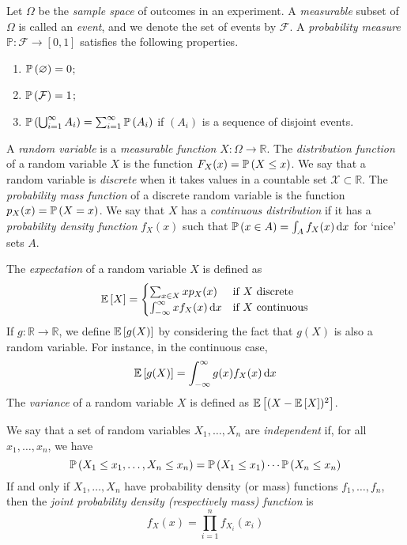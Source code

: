 Let \( \Omega \) be the \textit{sample space} of outcomes in an experiment.
A \textit{measurable} subset of \( \Omega \) is called an \textit{event}, and we denote the set of events by \( \mathcal F \).
A \textit{probability measure} \( \mathbb P \colon \mathcal F \to [0,1] \) satisfies the following properties.
\begin{enumerate}
	\item \( \mathbb{P}\left({\varnothing}\right) = 0 \);
	\item \( \mathbb{P}\left({\mathcal F}\right) = 1 \);
	\item \( \mathbb{P}\left({\bigcup_{i = 1}^\infty A_i}\right) = \sum_{i=1}^\infty \mathbb{P}\left({A_i}\right) \) if \( (A_i) \) is a sequence of disjoint events.
\end{enumerate}
A \textit{random variable} is a \textit{measurable function} \( X \colon \Omega \to \mathbb R \).
The \textit{distribution function} of a random variable \( X \) is the function \( F_X(x) = \mathbb{P}\left({X \leq x}\right) \).
We say that a random variable is \textit{discrete} when it takes values in a countable set \( \mathcal X \subset \mathbb R \).
The \textit{probability mass function} of a discrete random variable is the function \( p_X(x) = \mathbb{P}\left({X = x}\right) \).
We say that \( X \) has a \textit{continuous distribution} if it has a \textit{probability density function} \( f_X(x) \) such that \( \mathbb{P}\left({x \in A}\right) = \int_A f_X(x) \dd{x} \) for `nice' sets \( A \).

The \textit{expectation} of a random variable \( X \) is defined as
\[
	\mathbb{E}\left[{X}\right] = \begin{cases}
		\sum_{x \in X} x p_X(x)               & \text{if } X \text{ discrete}   \\
		\int_{-\infty}^\infty x f_X(x) \dd{x} & \text{if } X \text{ continuous}
	\end{cases}
\]
If \( g \colon \mathbb R \to \mathbb R \), we define \( \mathbb{E}\left[{g(X)}\right] \) by considering the fact that \( g(X) \) is also a random variable.
For instance, in the continuous case,
\[
	\mathbb{E}\left[{g(X)}\right] = \int_{-\infty}^\infty g(x) f_X(x) \dd{x}
\]
The \textit{variance} of a random variable \( X \) is defined as \( \mathbb{E}\left[{(X - \mathbb{E}\left[{X}\right])^2}\right] \).

We say that a set of random variables \( X_1, \dots, X_n \) are \textit{independent} if, for all \( x_1, \dots, x_n \), we have
\[
	\mathbb{P}\left({X_1 \leq x_1, \dots, X_n \leq x_n}\right) = \mathbb{P}\left({X_1 \leq x_1}\right) \cdots \mathbb{P}\left({X_n \leq x_n}\right)
\]
If and only if \( X_1, \dots, X_n \) have probability density (or mass) functions \( f_1, \dots, f_n \), then the \textit{joint probability density (respectively mass) function} is
\[
	f_X(x) = \prod_{i = 1}^n f_{X_i}(x_i)
\]

